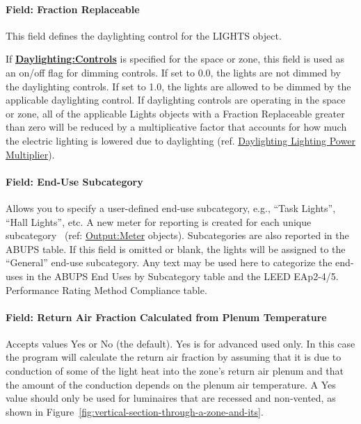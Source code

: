 \paragraph{Field: Fraction Replaceable}\label{field-fraction-replaceable}

This field defines the daylighting control for the LIGHTS object.

If \textbf{\hyperref[daylightingcontrols-000]{Daylighting:Controls}} is specified for the space or zone, this field is used as an on/off flag for dimming controls. If set to 0.0, the lights are not dimmed by the daylighting controls. If set to 1.0, the lights are allowed to be dimmed by the applicable daylighting control. If daylighting controls are operating in the space or zone, all of the applicable Lights objects with a Fraction Replaceable greater than zero will be reduced by a multiplicative factor that accounts for how much the electric lighting is lowered due to daylighting (ref. \hyperref[daylighting-lighting-power-multiplier-1]{Daylighting Lighting Power Multiplier}).

\paragraph{Field: End-Use Subcategory}\label{field-end-use-subcategory-002}

Allows you to specify a user-defined end-use subcategory, e.g., ``Task Lights'', ``Hall Lights'', etc. A new meter for reporting is created for each unique subcategory~ (ref: \hyperref[outputmeter-and-outputmetermeterfileonly]{Output:Meter} objects). Subcategories are also reported in the ABUPS table. If this field is omitted or blank, the lights will be assigned to the ``General'' end-use subcategory. Any text may be used here to categorize the end-uses in the ABUPS End Uses by Subcategory table and the LEED EAp2-4/5. Performance Rating Method Compliance table.

\paragraph{Field: Return Air Fraction Calculated from Plenum Temperature}\label{field-return-air-fraction-calculated-from-plenum-temperature}

Accepts values Yes or No (the default). Yes is for advanced used only. In this case the program will calculate the return air fraction by assuming that it is due to conduction of some of the light heat into the zone's return air plenum and that the amount of the conduction depends on the plenum air temperature. A Yes value should only be used for luminaires that are recessed and non-vented, as shown in Figure~\ref{fig:vertical-section-through-a-zone-and-its}.

